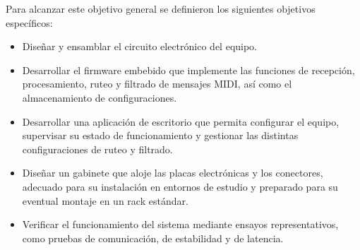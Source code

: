 Para alcanzar este objetivo general se definieron los siguientes objetivos específicos:
\begin{itemize}
	\item Diseñar y ensamblar el circuito electrónico del equipo.
	\item Desarrollar el firmware embebido que implemente las funciones de recepción, procesamiento, ruteo y filtrado de mensajes MIDI, así como el almacenamiento de configuraciones.
	\item Desarrollar una aplicación de escritorio que permita configurar el equipo, supervisar su estado de funcionamiento y gestionar las distintas configuraciones de ruteo y filtrado.
	\item Diseñar un gabinete que aloje las placas electrónicas y los conectores, adecuado para su instalación en entornos de estudio y preparado para su eventual montaje en un rack estándar.
	\item Verificar el funcionamiento del sistema mediante ensayos representativos, como pruebas de comunicación, de estabilidad y de latencia.
\end{itemize}

